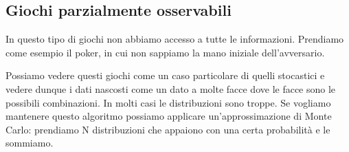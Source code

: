     \subsection{Giochi parzialmente osservabili}
        In questo tipo di giochi non abbiamo accesso a tutte le informazioni. Prendiamo come esempio il poker, in cui non sappiamo la mano iniziale dell'avversario.
        
        Possiamo vedere questi giochi come un caso particolare di quelli stocastici e vedere dunque i dati nascosti come un dato a molte facce dove le facce sono le possibili combinazioni. In molti casi le distribuzioni sono troppe. Se vogliamo mantenere questo algoritmo possiamo applicare un'approssimazione di Monte Carlo: prendiamo N distribuzioni che appaiono con una certa probabilità e le sommiamo.